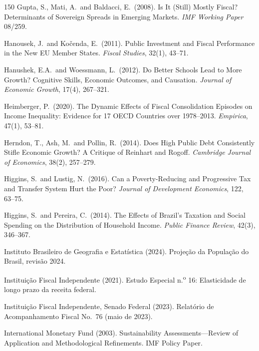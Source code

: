 \documentclass[11pt,a4paper]{article}
\begin{document}
\begin{thebibliography}{150}
 Gupta, S., Mati, A.\ and Baldacci, E.\ (2008). Is It (Still) Mostly Fiscal? Determinants of Sovereign Spreads in Emerging Markets. \textit{IMF Working Paper} 08/259.

 Hanousek, J.\ and Ko\v{c}enda, E.\ (2011). Public Investment and Fiscal Performance in the New EU Member States. \textit{Fiscal Studies}, 32(1), 43--71.

 Hanushek, E.A.\ and Woessmann, L.\ (2012). Do Better Schools Lead to More Growth? Cognitive Skills, Economic Outcomes, and Causation. \textit{Journal of Economic Growth}, 17(4), 267--321.

 Heimberger, P.\ (2020). The Dynamic Effects of Fiscal Consolidation Episodes on Income Inequality: Evidence for 17 OECD Countries over 1978--2013. \textit{Empirica}, 47(1), 53--81.

 Herndon, T., Ash, M.\ and Pollin, R.\ (2014). Does High Public Debt Consistently Stifle Economic Growth? A Critique of Reinhart and Rogoff. \textit{Cambridge Journal of Economics}, 38(2), 257--279.

 Higgins, S.\ and Lustig, N.\ (2016). Can a Poverty-Reducing and Progressive Tax and Transfer System Hurt the Poor? \textit{Journal of Development Economics}, 122, 63--75.

 Higgins, S.\ and Pereira, C.\ (2014). The Effects of Brazil's Taxation and Social Spending on the Distribution of Household Income. \textit{Public Finance Review}, 42(3), 346--367.

 Instituto Brasileiro de Geografia e Estat\'istica (2024). Proje\c{c}\~ao da Popula\c{c}\~ao do Brasil, revis\~ao 2024.

 Instituição Fiscal Independente (2021). Estudo Especial n.\textsuperscript{o} 16: Elasticidade de longo prazo da receita federal.

 Instituição Fiscal Independente, Senado Federal (2023). Relat\'orio de Acompanhamento Fiscal No.\ 76 (maio de 2023).

 International Monetary Fund (2003). Sustainability Assessments---Review of Application and Methodological Refinements. IMF Policy Paper.


\end{thebibliography}
\end{document}
